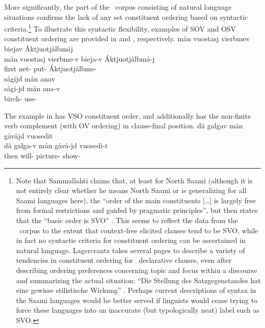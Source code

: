 More significantly, the part of the \PS\ corpus consisting of natural language situations confirms the lack of any set constituent ordering based on syntactic criteria.\footnote{Note that Sammallahti claims that, at least for North Saami (although it is not entirely clear whether he means North Saami or is generalizing for all Saami languages here), the “order of the main constituents […] is largely free from formal restrictions and guided by pragmatic principles”, but then states that the “basic order is SVO” \citep[95]{Sammallahti1998}. This seems to reflect the data from the \PS\ corpus to the extent that context-free elicited clauses tend to be SVO, while in fact no syntactic criteria for constituent ordering can be ascertained in natural language. 
Lagercrantz takes several pages to describe a variety of tendencies in constituent ordering for \PS\ declarative clauses, even after describing ordering preferences concerning topic and focus within a discourse and summarizing the actual situation: “Die Stellung des Satzgegenstandes hat eine gewisse stilistische Wirkung” \citep[46]{Lagercrantz1926}. %
Perhaps current descriptions of syntax in the Saami languages would be better served if linguists %
would cease trying to force these languages into an inaccurate (but typologically neat) label such as SVO.} 
To illustrate this syntactic flexibility, examples of SOV and OSV %
constituent ordering are provided in  and , %
respectively.
\ea\label{deviantConstituentOrder1}
\glll	mån vuostasj vierbmev biejav Áktjuotjålbmáj \\
	mån vuostasj vierbme-v bieja-v Áktjuotjålbmá-j \\
	 first net- put- Áktjuotjålbme-\\\nopagebreak
{} 
\z
\ea\label{deviantConstituentOrder2}%
\glll	sågijd mån anav\\
	sågi-jd mån ana-v\\
	birch-  use- \\\nopagebreak
{} 
\z

The example in  has VSO constituent order, and additionally has the non-finite verb complement (with OV ordering) in clause-final position.
\ea\label{deviantConstituentOrder4}%
\glll	dä galgav mån gåvåjd vuosedit\\
	dä galga-v mån gåvå-jd vuosedi-t\\
	then will-  picture-  show- \\\nopagebreak
{} 
\z

